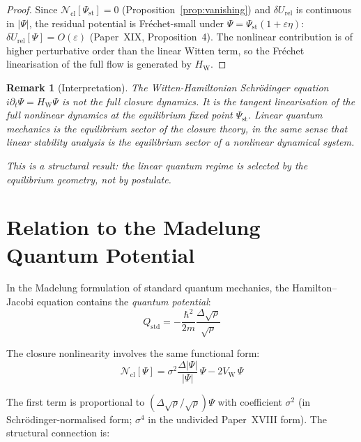 \documentclass[12pt]{article}
\newtheorem{remark}[theorem]{Remark}
\newcommand{\Ncl}{\mathcal{N}_{\mathrm{cl}}}
\newcommand{\VW}{V_{\mathrm{W}}}
\newcommand{\HW}{H_{\mathrm{W}}}
\newcommand{\dUrel}{\delta U_{\mathrm{rel}}}
\begin{document}
\begin{proof}
Since $\Ncl[\Psi_{\mathrm{st}}] = 0$ (Proposition~\ref{prop:vanishing}) and $\dUrel$ is continuous in $|\Psi|$, the residual potential is Fr\'echet-small under $\Psi = \Psi_{\mathrm{st}}(1 + \varepsilon\eta)$: $\dUrel[\Psi] = O(\varepsilon)$ (Paper~XIX, Proposition~4). The nonlinear contribution is of higher perturbative order than the linear Witten term, so the Fr\'echet linearisation of the full flow is generated by $\HW$.
\end{proof}

\begin{remark}[Interpretation]
The Witten-Hamiltonian Schr\"odinger equation $i\partial_t\Psi = \HW\Psi$ is not the full closure dynamics. It is the \textit{tangent linearisation} of the full nonlinear dynamics at the equilibrium fixed point $\Psi_{\mathrm{st}}$. Linear quantum mechanics is the equilibrium sector of the closure theory, in the same sense that linear stability analysis is the equilibrium sector of a nonlinear dynamical system.

This is a structural result: the linear quantum regime is selected by the equilibrium geometry, not by postulate.
\end{remark}

\section{Relation to the Madelung Quantum Potential}\label{sec:madelung}

In the Madelung formulation of standard quantum mechanics, the Hamilton--Jacobi equation contains the \textit{quantum potential}:
\begin{equation}
    Q_{\mathrm{std}} = -\frac{\hbar^2}{2m}\frac{\Delta\sqrt{\rho}}{\sqrt{\rho}}
\end{equation}

The closure nonlinearity involves the same functional form:
\begin{equation}
    \Ncl[\Psi] = \sigma^2\frac{\Delta|\Psi|}{|\Psi|}\,\Psi - 2\VW\,\Psi
\end{equation}

The first term is proportional to $(\Delta\sqrt\rho/\sqrt\rho)\Psi$ with coefficient $\sigma^2$ (in Schr\"odinger-normalised form; $\sigma^4$ in the undivided Paper~XVIII form). The structural connection is:
\end{document}
